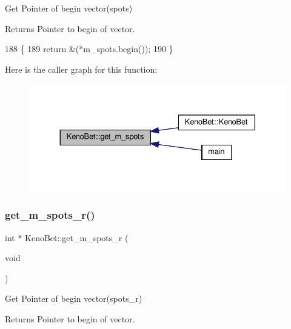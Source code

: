 Get Pointer of begin vector(spots) 

\begin{DoxyReturn}{Returns}
Pointer to begin of vector. 
\end{DoxyReturn}

\begin{DoxyCode}
188 \{
189     \textcolor{keywordflow}{return} &(*m\_spots.begin());
190 \}
\end{DoxyCode}
Here is the caller graph for this function\+:
\nopagebreak
\begin{figure}[H]
\begin{center}
\leavevmode
\includegraphics[width=330pt]{classKenoBet_a386ab5f7108fd2df3518f37bfca2b2ef_icgraph}
\end{center}
\end{figure}
\mbox{\label{classKenoBet_a1a124437ed672df3e4e7d195d9716540}} 
\subsubsection{\texorpdfstring{get\+\_\+m\+\_\+spots\+\_\+r()}{get\_m\_spots\_r()}}
{\footnotesize\ttfamily int $\ast$ Keno\+Bet\+::get\+\_\+m\+\_\+spots\+\_\+r (\begin{DoxyParamCaption}\item[{void}]{ }\end{DoxyParamCaption})}



Get Pointer of begin vector(spots\+\_\+r) 

\begin{DoxyReturn}{Returns}
Pointer to begin of vector. 
\end{DoxyReturn}

